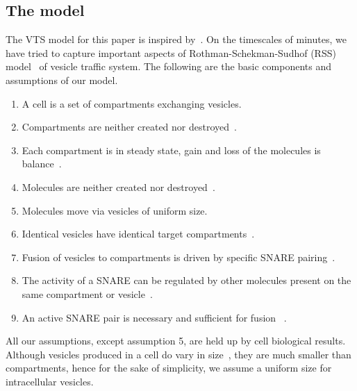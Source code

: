 \subsection{The model}
\noindent The VTS model for this paper is inspired by~\cite{shukla2017discovering}. 
%
On the timescales of minutes, we have tried to capture important aspects of Rothman-Schekman-Sudhof (RSS) model~\cite{rothman2002machinery} of vesicle traffic system.
%
The following are the basic components and assumptions of our model. 
\begin{enumerate}
\item A cell is a set of compartments exchanging vesicles.
\item Compartments are neither created nor destroyed~\cite{braell1984glycoprotein}.
\item Each compartment is in steady state, gain and loss of the molecules is balance~\cite{braell1984glycoprotein}.
\item Molecules are neither created nor destroyed~\cite{he2009differential}.
\item Molecules move via vesicles of uniform size.
\item Identical vesicles have identical target compartments~\cite{fries1981transient}.
\item Fusion of vesicles to compartments is driven by specific SNARE pairing~\cite{mcnew2000compartmental}.
\item The activity of a SNARE can be regulated by other molecules present on the same compartment or vesicle~\cite{mima2008reconstituted}.
\item An active SNARE pair is necessary and sufficient for fusion~\cite{weber1998snarepins}
. 
\end{enumerate}
%
All our assumptions, except assumption 5, are held up by cell biological results.
%
Although vesicles produced in a cell do vary in size~\cite{jena2008intracellular}, they are much smaller than compartments, hence for the sake of simplicity, we assume a uniform size for intracellular vesicles.

